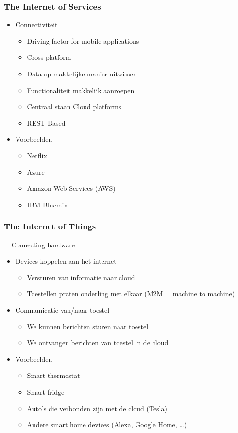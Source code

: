 \documentclass{article}
\begin{document}
\subsubsection{The Internet of Services}
\begin{itemize}
    \item Connectiviteit
    \begin{itemize}
        \item Driving factor for mobile applications
        \item Cross platform
        \item Data op makkelijke manier uitwissen
        \item Functionaliteit makkelijk aanroepen
        \item Centraal staan Cloud platforms
        \item REST-Based
    \end{itemize}
    \item Voorbeelden
    \begin{itemize}
        \item Netflix
        \item Azure
        \item Amazon Web Services (AWS)
        \item IBM Bluemix
    \end{itemize}
\end{itemize}


\subsubsection{The Internet of Things}
= Connecting hardware

\begin{itemize}
    \item Devices koppelen aan het internet
    \begin{itemize}
        \item Versturen van informatie naar cloud
        \item Toestellen praten onderling met elkaar (M2M = machine to machine)
    \end{itemize}
    \item Communicatie van/naar toestel
    \begin{itemize}
        \item We kunnen berichten sturen naar toestel
        \item We ontvangen berichten van toestel in de cloud
    \end{itemize}
    \item Voorbeelden
    \begin{itemize}
        \item Smart thermostat
        \item Smart fridge
        \item Auto's die verbonden zijn met de cloud (Tesla)
        \item Andere smart home devices (Alexa, Google Home, \dots)
    \end{itemize}
\end{itemize}
\end{document}
